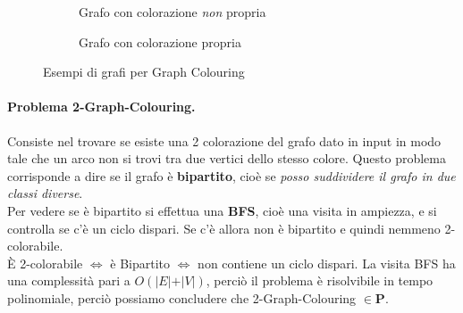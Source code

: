 \documentclass[a4paper]{article}
\theoremstyle{definition}
\newcommand{\p}{\mathbf{P}}
\begin{document}
			\begin{figure}[h!]
				\centering
				\begin{subfigure}{.5\textwidth}
					\centering
					\caption{Grafo con colorazione \textit{non} propria}
				\end{subfigure}%
				\begin{subfigure}{.5\textwidth}
					\centering
					\caption{Grafo con colorazione propria}
				\end{subfigure}%
				\caption{Esempi di grafi per Graph Colouring}
			\end{figure}
			
			\paragraph{Problema 2-Graph-Colouring.}
			Consiste nel trovare se esiste una 2 colorazione del grafo dato in input in modo tale che un arco non si trovi tra due vertici dello stesso colore. Questo problema corrisponde a dire se il grafo è \textbf{bipartito}, cioè se \textit{posso suddividere il grafo in due classi diverse}. \\
			Per vedere se è bipartito si effettua una \textbf{BFS}, cioè una visita in ampiezza, e si controlla se c'è un ciclo dispari. Se c'è allora non è bipartito e quindi nemmeno 2-colorabile.\\
			
			\noindent
			È 2-colorabile $ \Leftrightarrow $ è Bipartito $ \Leftrightarrow $ non contiene un ciclo dispari. La visita BFS ha una complessità pari a $ O(\vert E \vert + \vert V \vert) $, perciò il problema è risolvibile in tempo polinomiale, perciò possiamo concludere che 2-Graph-Colouring $ \in \p $.
			
\end{document}
